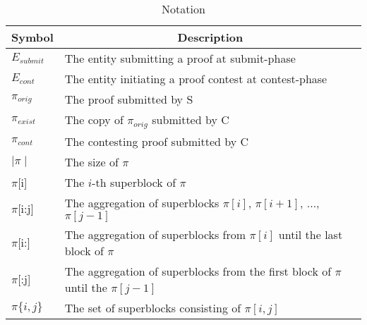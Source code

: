 \begin{table}[H]
\begin{tabular}{ll}
\hline
\multicolumn{1}{|c|}{Symbol} & \multicolumn{1}{c|}{Description}                       \\ \hline
$E_{submit}$                   & The entity submitting a proof at submit-phase          \\
$E_{cont}$                     & The entity initiating a proof contest at contest-phase \\
$\pi_{orig}$                 & The proof submitted by S                               \\
$\pi_{exist}$                & The copy of $\pi_{orig}$ submitted by C                \\
$\pi_{cont}$                 & The contesting proof submitted by C                    \\
$\mid\pi\mid$                 & The size of $\pi$                  \\
$\pi${[}i{]}                 & The $i$-th superblock of $\pi$                  \\
$\pi${[}i:j{]} & The aggregation of superblocks $\pi[i]$, $\pi[i+1]$, ..., $\pi[j-1]$              \\
$\pi${[}i:{]}  & The aggregation of superblocks from $\pi[i]$ until the last block of $\pi$        \\
$\pi${[}:j{]}  & The aggregation of superblocks from the first block of $\pi$ until the $\pi[j-1]$ \\
$\pi\{i, j\}$                & The set of superblocks consisting of $\pi[i,j]$
\end{tabular}
\caption{Notation}
\label{table:notation}
\end{table}
